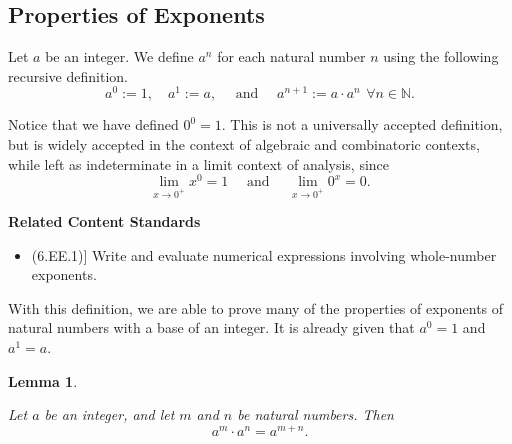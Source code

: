 \documentclass[
]{book}
\providecommand{\tightlist}{%
  \setlength{\itemsep}{0pt}\setlength{\parskip}{0pt}}
\newenvironment{standards}{}{}
\newtheorem{lemma}{Lemma}[chapter]
\theoremstyle{definition}
\theoremstyle{definition}
\theoremstyle{definition}
\theoremstyle{definition}
\theoremstyle{remark}
\begin{document}
\hypertarget{properties-of-exponents}{%
\subsection{Properties of Exponents}\label{properties-of-exponents}}

Let \(a\) be an integer. We define \(a^n\) for each natural number \(n\) using the following recursive definition.
\[a^0:=1, \quad a^1 := a, \quad \mbox{ and } \quad a^{n+1}:=a \cdot a^n\, \: \forall n\in \mathbb{N}.\]

Notice that we have defined \(0^0=1\). This is not a universally accepted definition, but is widely accepted in the context of algebraic and combinatoric contexts, while left as indeterminate in a limit context of analysis, since
\[\lim_{x\rightarrow 0^+} x^0 = 1 \quad \mbox{ and } \quad \lim_{x\rightarrow 0^+} 0^x = 0.\]

\begin{standards}

\begin{center}
\textbf{Related Content Standards}

\end{center}

\begin{itemize}
\tightlist
\item
  (6.EE.1){]} Write and evaluate numerical expressions involving whole-number exponents.
\end{itemize}

\end{standards}

With this definition, we are able to prove many of the properties of exponents of natural numbers with a base of an integer. It is already given that \(a^0=1\) and \(a^1=a\).

\begin{lemma}
\protect\hypertarget{lem:exponent-addition}{}\label{lem:exponent-addition}

Let \(a\) be an integer, and let \(m\) and \(n\) be natural numbers. Then
\[a^m\cdot a^n=a^{m+n}.\]

\end{lemma}
\end{document}
